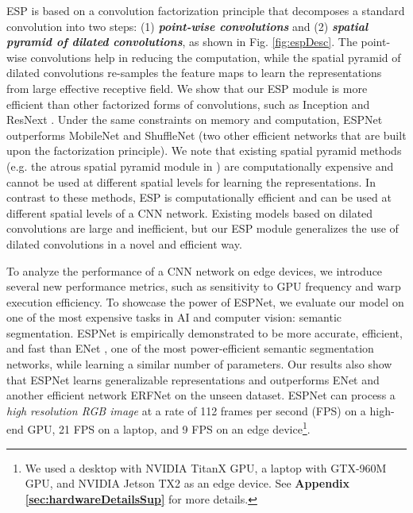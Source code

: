 \documentclass[runningheads]{llncs}
\def\Fig{Fig. }
\begin{document}
ESP is based on a convolution factorization principle that decomposes a standard convolution into two steps: (1) \textbf{\textit{point-wise convolutions}} and (2) \textbf{\textit{spatial pyramid of dilated convolutions}}, as shown in \Fig \ref{fig:espDesc}. The point-wise convolutions help in reducing the computation, while the spatial pyramid of dilated convolutions re-samples the feature maps to learn the representations from large effective receptive field. We show that our ESP module is more efficient than other factorized forms of convolutions, such as Inception \cite{szegedy2015going,szegedy2016rethinking,SzegedyIV16InceptionV4} and  ResNext \cite{xie2017aggregated}. Under the same constraints on memory and computation, ESPNet outperforms  MobileNet \cite{howard2017mobilenets} and ShuffleNet \cite{zhang2017shufflenet} (two other efficient networks that are built upon the factorization principle). We note that existing spatial pyramid methods (e.g. the atrous spatial pyramid module in \cite{chen2016deeplab}) are computationally expensive and cannot be used at different spatial levels for learning the representations. In contrast to these methods, ESP is computationally efficient and can be used at different spatial levels of a CNN network. Existing models based on dilated convolutions \cite{zhao2017pyramid,chen2016deeplab,yu2015multi,yu2017dilated} are large and inefficient, but our ESP module generalizes the use of dilated convolutions in a novel and efficient way.   

To analyze the performance of a CNN network on edge devices, we introduce several new performance metrics, such as sensitivity to GPU frequency and warp execution efficiency.
To showcase the power of ESPNet, we evaluate our model on one of the most expensive tasks in AI and computer vision: semantic segmentation. ESPNet is empirically demonstrated to be more accurate, efficient, and fast than ENet \cite{paszke2016enet}, one of the most power-efficient semantic segmentation networks, while learning a similar number of parameters. Our results also show that ESPNet learns generalizable representations and outperforms ENet \cite{paszke2016enet} and another efficient network ERFNet \cite{romera2018erfnet} on the unseen dataset. ESPNet can process a \textit{high resolution RGB image} at a rate of 112 frames per second (FPS) on a high-end GPU, 21 FPS on a laptop, and 9 FPS on an edge device\footnote{We used a desktop with NVIDIA TitanX GPU, a laptop with GTX-960M GPU, and NVIDIA Jetson TX2 as an edge device. See \textbf{Appendix \ref{sec:hardwareDetailsSup}} for more details.}.  
\end{document}

